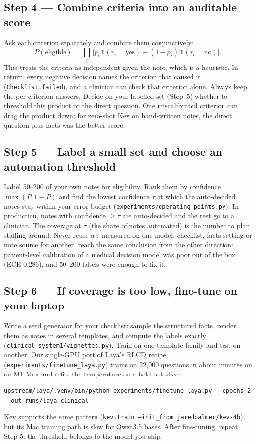 \documentclass[11pt]{article}
\newcommand{\step}[1]{\subsection*{#1}}
\begin{document}
\step{Step 4 --- Combine criteria into an auditable score}
Ask each criterion separately and combine them conjunctively:
\begin{equation}
P(\text{eligible}) = \textstyle\prod_i \big[p_i\,\mathbf{1}(r_i=\text{yes}) + (1-p_i)\,\mathbf{1}(r_i=\text{no})\big].
\end{equation}
This treats the criteria as independent given the note, which is a heuristic. In return, every negative decision names the criterion that caused it (\texttt{Checklist.failed}), and a clinician can check that criterion alone.
Always keep the per-criterion answers. Decide on your labelled set (Step~5) whether to threshold this product or the direct question. One miscalibrated criterion can drag the product down; for zero-shot Kev on hand-written notes, the direct question plus facts was the better score.

\step{Step 5 --- Label a small set and choose an automation threshold}
Label 50--200 of your own notes for eligibility.
Rank them by confidence $\max(P,1-P)$ and find the lowest confidence $\tau$ at which the auto-decided notes stay within your error budget (\nolinkurl{experiments/operating_points.py}).
In production, notes with confidence $\geq\tau$ are auto-decided and the rest go to a clinician.
The coverage at $\tau$ (the share of notes automated) is the number to plan staffing around.
Never reuse a $\tau$ measured on one model, checklist, facts setting or note source for another.
\citet{lee2026medjev} reach the same conclusion from the other direction: patient-level calibration of a medical decision model was poor out of the box (ECE 0.286), and 50--200 labels were enough to fix it.

\step{Step 6 --- If coverage is too low, fine-tune on your laptop}
Write a seed generator for your checklist: sample the structured facts, render them as notes in several templates, and compute the labels exactly (\texttt{clinical\_system1/vignettes.py}).
Train on one template family and test on another.
Our single-GPU port of Laya's RLCD recipe (\nolinkurl{experiments/finetune_laya.py}) trains on 22{,}000 questions in about \FTMinutes{} minutes on an M1 Max and refits the temperature on a held-out slice:
\begin{lstlisting}
upstream/laya/.venv/bin/python experiments/finetune_laya.py --epochs 2 --out runs/laya-clinical
\end{lstlisting}
Kev supports the same pattern (\texttt{kev.train --init\_from jaredpalmer/kev-4b}), but its Mac training path is slow for Qwen3.5 bases.
After fine-tuning, repeat Step 5: the threshold belongs to the model you ship.
\end{document}
